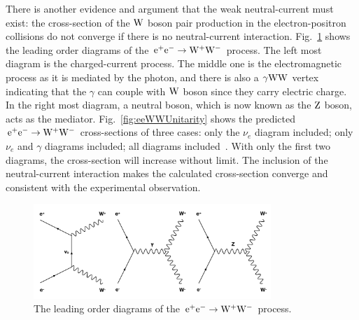 There is another evidence and argument that the weak neutral-current must exist: the cross-section of the $\mathrm{W}$ boson pair production in the electron-positron collisions do not converge if there is no neutral-current interaction. Fig.~\ref{fig:eeWWDiagrams} shows the leading order diagrams of the $\mathrm{e}^+\mathrm{e}^-\to\mathrm{W}^{+}\mathrm{W}^{-}$ process. The left most diagram is the charged-current process. The middle one is the electromagnetic process as it is mediated by the photon, and there is also a $\gamma\mathrm{W}\mathrm{W}$ vertex indicating that the $\gamma$ can couple with $\mathrm{W}$ boson since they carry electric charge. In the right most diagram, a neutral boson, which is now known as the $\mathrm{Z}$ boson, acts as the mediator. 
Fig.~\ref{fig:eeWWUnitarity} shows the predicted $\mathrm{e}^+\mathrm{e}^-\to\mathrm{W}^{+}\mathrm{W}^{-}$ cross-sections of three cases: only the $\nu_{e}$ diagram included; only $\nu_{e}$ and $\gamma$ diagrams included; all diagrams included~\cite{Schael:2013ita}. With only the first two diagrams, the cross-section will increase without limit. The inclusion of the neutral-current interaction makes the calculated cross-section converge and consistent with the experimental observation. 
\begin{figure}[!ht]
  \begin{center}  
    \includegraphics[width=0.8\textwidth]{Fig/eeWW}
    \caption{The leading order diagrams of the $\mathrm{e}^+\mathrm{e}^-\to\mathrm{W}^{+}\mathrm{W}^{-}$ process. \label{fig:eeWWDiagrams}} 
  \end{center}
\end{figure}

